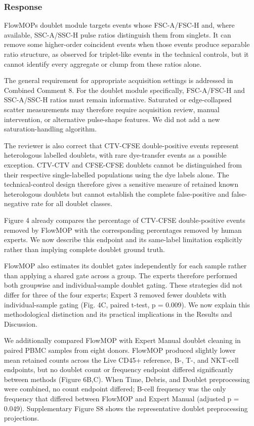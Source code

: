 \documentclass[
  11pt,
  a4paper,
]{article}
\begin{document}
\subsubsection{Response}\label{response-10}

FlowMOP\textquotesingle s doublet module targets events whose
FSC-A/FSC-H and, where available, SSC-A/SSC-H pulse ratios distinguish
them from singlets. It can remove some higher-order coincident events
when those events produce separable ratio structure, as observed for
triplet-like events in the technical controls, but it cannot identify
every aggregate or clump from these ratios alone.

The general requirement for appropriate acquisition settings is
addressed in Combined Comment 8. For the doublet module specifically,
FSC-A/FSC-H and SSC-A/SSC-H ratios must remain informative. Saturated or
edge-collapsed scatter measurements may therefore require acquisition
review, manual intervention, or alternative pulse-shape features. We did
not add a new saturation-handling algorithm.

The reviewer is also correct that CTV-CFSE double-positive events
represent heterologous labelled doublets, with rare dye-transfer events
as a possible exception. CTV-CTV and CFSE-CFSE doublets cannot be
distinguished from their respective single-labelled populations using
the dye labels alone. The technical-control design therefore gives a
sensitive measure of retained known heterologous doublets but cannot
establish the complete false-positive and false-negative rate for all
doublet classes.

Figure 4 already compares the percentage of CTV-CFSE double-positive
events removed by FlowMOP with the corresponding percentages removed by
human experts. We now describe this endpoint and its same-label
limitation explicitly rather than implying complete doublet ground
truth.

FlowMOP also estimates its doublet gates independently for each sample
rather than applying a shared gate across a group. The experts therefore
performed both groupwise and individual-sample doublet gating. These
strategies did not differ for three of the four experts; Expert 3
removed fewer doublets with individual-sample gating (Fig. 4C, paired
t-test, p = 0.009). We now explain this methodological distinction and
its practical implications in the Results and Discussion.

We additionally compared FlowMOP with Expert Manual doublet cleaning in
paired PBMC samples from eight donors. FlowMOP produced slightly lower
mean retained counts across the Live CD45+ reference, B-, T-, and
NKT-cell endpoints, but no doublet count or frequency endpoint differed
significantly between methods (Figure 6B,C). When Time, Debris, and
Doublet preprocessing were combined, no count endpoint differed; B-cell
frequency was the only frequency that differed between FlowMOP and
Expert Manual (adjusted p = 0.049). Supplementary Figure S8 shows the
representative doublet preprocessing projections.
\end{document}
